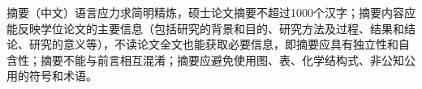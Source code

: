 \QAUabstracttitleCN

{\kaishu\fontsize{12bp}{21bp}\selectfont
摘要（中文）语言应力求简明精炼，硕士论文摘要不超过1000个汉字；摘要内容应能反映学位论文的主要信息（包括研究的背景和目的、研究方法及过程、结果和结论、研究的意义等），不读论文全文也能获取必要信息，即摘要应具有独立性和自含性；摘要不能与前言相互混淆；摘要应避免使用图、表、化学结构式、非公知公用的符号和术语。\par}

\vspace{0.5\baselineskip}

{\kaishu\fontsize{12bp}{21bp}\selectfont
\noindent{}\par}
